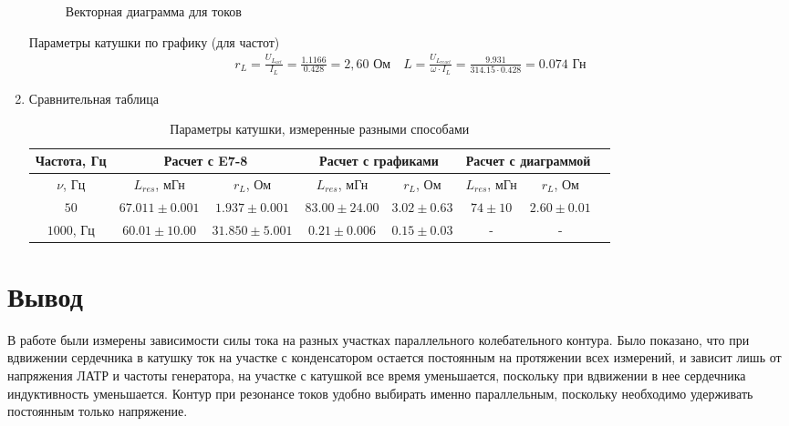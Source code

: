 \documentclass[a4paper, 12pt]{article}
\begin{document}
\begin{enumerate}
\begin{figure}[H]
        \label{треугольная векторная диаграмма}
        \caption{Векторная диаграмма для токов}
    \end{figure}
    Параметры катушки по графику (для частот)
    \begin{align}
        r_L = \frac{U_{L_{act}}}{{I_L}} = \frac{1.1166}{0.428} = 2,60\text{ Ом} \quad
        L = \frac{U_{L_{react}}}{\omega \cdot I_L} = \frac{9.931}{314.15 \cdot 0.428} = 0.074\text{ Гн}
    \end{align}
    \item Сравнительная таблица 
    \begin{table}[H]
        \centering
        \begin{tabular}{|c|c|c|c|c|c|c|c|}
            \hline
            Частота, Гц & \multicolumn{2}{|c|}{Расчет с E7-8} & \multicolumn{2}{|c|}{Расчет с графиками} & \multicolumn{2}{|c|}{Расчет с диаграммой}\\
            \hline
            $\nu$, Гц & $L_{res}$, мГн & $r_{L}$, Ом &  $L_{res}$, мГн & $r_{L}$, Ом & $L_{res}$, мГн & $r_{L}$, Ом\\
            \hline
            $50$ & $67.011\pm 0.001$ & $1.937\pm 0.001$ & $83.00\pm 24.00$ & $3.02\pm 0.63$ & $74\pm 10$ & $2.60\pm 0.01$\\
            $1000$, Гц & $60.01\pm 10.00$ & $31.850\pm 5.001$ & $0.21\pm 0.006$ & $0.15 \pm 0.03$ & - & -\\
            \hline
        \end{tabular}
        \caption{Параметры катушки, измеренные разными способами}
        \label{Параметры катушки, измеренные разными способами}
    \end{table}
\end{enumerate}
\section*{Вывод}
В работе были измерены зависимости силы тока на разных участках параллельного колебательного контура. 
Было показано, что при вдвижении сердечника в катушку ток на участке с конденсатором остается постоянным на протяжении всех измерений, и зависит лишь от напряжения ЛАТР и частоты генератора, на участке с катушкой все время уменьшается, поскольку при вдвижении в нее
сердечника индуктивность уменьшается.
Контур при резонансе токов удобно выбирать именно параллельным, поскольку необходимо удерживать постоянным только напряжение.
\end{document}
